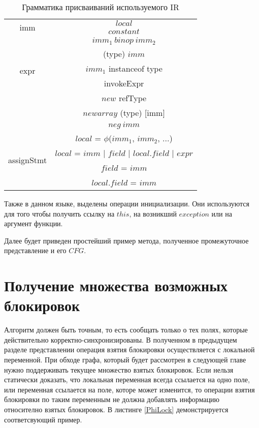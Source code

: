 \begin{table}[H]
\label{grammar}
\begin{center}
\begin{tabular}{|c|c|}
\hline

\multirow{2}{*}{imm}  & $local$ \\
		      & $constant$ \\
\hline
\multirow{5}{*}{expr} & $imm_1\ binop\ imm_2$ \\
		      & (type) $imm$ \\
		      & $imm_1$ instanceof type \\
      		      & invokeExpr \\
      		      & $new$ refType \\
      		      & $newarray$ (type) [imm] \\
		      & $neg\ imm$ \\
\hline
\multirow{4}{*}{assignStmt} & $local$ = $\phi$($imm_1$, $imm_2$, ...) \\ 
			    & $local$ = $imm$ | $field$ | $local.field$ | $expr$  \\ 
		            & $field$ = $imm$ \\
			    & $local.field$ = $imm$ \\
\hline
\end{tabular}
\captionsetup{justification=centering}
\caption{Грамматика присваиваний используемого IR}
\end{center}

\end{table}

Также в данном языке, выделены операции инициализации. Они используются для того чтобы получить ссылку на $this$, на возникший $exception$ или на аргумент функции. 


Далее будет приведен простейший пример метода, полученное промежуточное представление и его $CFG$.

\renewcommand{\lstlistingname}{}

\renewcommand{\lstlistingname}{Листинг}




\FloatBarrier
\section{Получение множества возможных блокировок}
Алгоритм должен быть точным, то есть сообщать только о тех полях, которые действительно корректно-синхронизированы.
В полученном в предыдущем разделе представлении операция взятия блокировки осуществляется с локальной переменной. 
При обходе графа, который будет рассмотрен в следующей главе нужно поддерживать текущее множество взятых блокировок.
Если нельзя статически доказать, что локальная переменная всегда ссылается на одно поле, или переменная ссылается на поле, которе может изменится, то операции взятия блокировки по таким переменным не должна добавлять информацию относително взятых блокировок.
В листинге \ref{PhiLock} демонстрируется соответсвующий пример.

